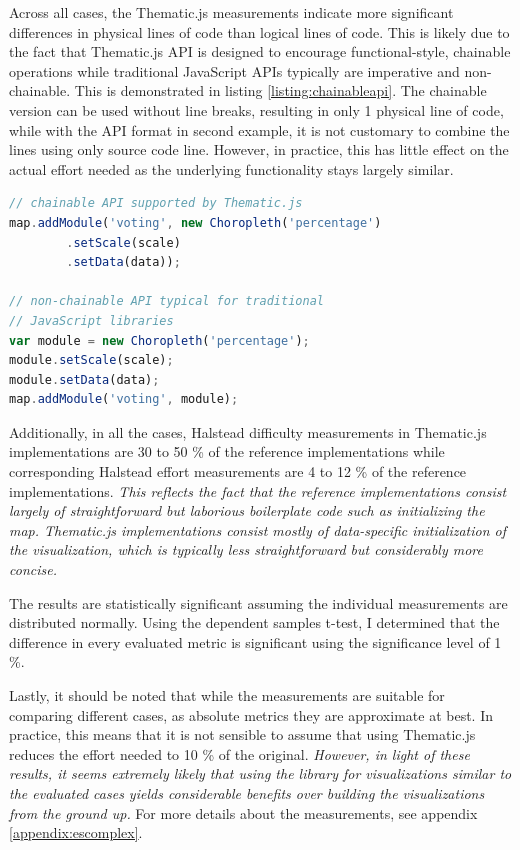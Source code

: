 Across all cases, the Thematic.js measurements indicate more significant differences in physical lines of code than logical lines of code. This is likely due to the fact that Thematic.js API is designed to encourage functional-style, chainable operations while traditional JavaScript APIs typically are imperative and non-chainable. This is demonstrated in listing \ref{listing:chainableapi}. The chainable version can be used without line breaks, resulting in only 1 physical line of code, while with the API format in second example, it is not customary to combine the lines using only source code line. However, in practice, this has little effect on the actual effort needed as the underlying functionality stays largely similar.

\begin{lstlisting}[caption=Thematic.js API format. The code has been simplified to increase readability.,language=JavaScript,label=listing:chainableapi]
// chainable API supported by Thematic.js
map.addModule('voting', new Choropleth('percentage')
        .setScale(scale)
        .setData(data));

// non-chainable API typical for traditional
// JavaScript libraries
var module = new Choropleth('percentage');
module.setScale(scale);
module.setData(data);
map.addModule('voting', module);
\end{lstlisting}

Additionally, in all the cases, Halstead difficulty measurements in Thematic.js implementations are 30 to 50 \% of the reference implementations while corresponding Halstead effort measurements are 4 to 12 \% of the reference implementations. \emph{This reflects the fact that the reference implementations consist largely of straightforward but laborious boilerplate code such as initializing the map. Thematic.js implementations consist mostly of data-specific initialization of the visualization, which is typically less straightforward but considerably more concise.}

The results are statistically significant assuming the individual measurements are distributed normally. Using the dependent samples t-test, I determined that the difference in every evaluated metric is significant using the significance level of 1 \%.

Lastly, it should be noted that while the measurements are suitable for comparing different cases, as absolute metrics they are approximate at best. In practice, this means that it is not sensible to assume that using Thematic.js reduces the effort needed to 10 \% of the original. \emph{However, in light of these results, it seems extremely likely that using the library for visualizations similar to the evaluated cases yields considerable benefits over building the visualizations from the ground up.} For more details about the measurements, see appendix \ref{appendix:escomplex}.

